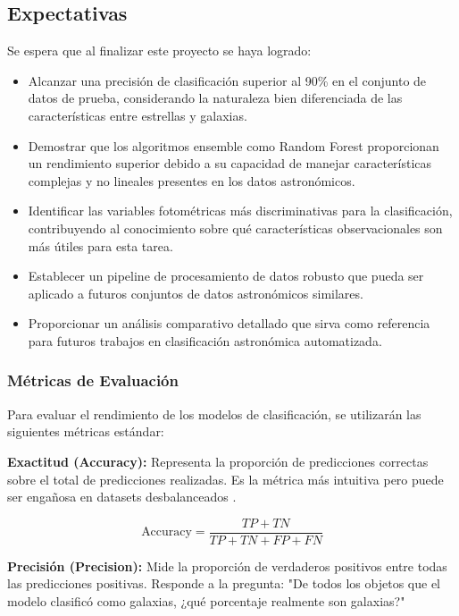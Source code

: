 \documentclass{article}
\begin{document}
\subsection{Expectativas}

Se espera que al finalizar este proyecto se haya logrado:

\begin{itemize}
    \item Alcanzar una precisión de clasificación superior al 90\% en el conjunto de datos de prueba, considerando la naturaleza bien diferenciada de las características entre estrellas y galaxias.
    \item Demostrar que los algoritmos ensemble como Random Forest proporcionan un rendimiento superior debido a su capacidad de manejar características complejas y no lineales presentes en los datos astronómicos.
    \item Identificar las variables fotométricas más discriminativas para la clasificación, contribuyendo al conocimiento sobre qué características observacionales son más útiles para esta tarea.
    \item Establecer un pipeline de procesamiento de datos robusto que pueda ser aplicado a futuros conjuntos de datos astronómicos similares.
    \item Proporcionar un análisis comparativo detallado que sirva como referencia para futuros trabajos en clasificación astronómica automatizada.
\end{itemize}

\subsubsection{Métricas de Evaluación}

Para evaluar el rendimiento de los modelos de clasificación, se utilizarán las siguientes métricas estándar:

\textbf{Exactitud (Accuracy):} Representa la proporción de predicciones correctas sobre el total de predicciones realizadas. Es la métrica más intuitiva pero puede ser engañosa en datasets desbalanceados \cite{accuracy_metric}.

\begin{equation}
\text{Accuracy} = \frac{TP + TN}{TP + TN + FP + FN}
\end{equation}

\textbf{Precisión (Precision):} Mide la proporción de verdaderos positivos entre todas las predicciones positivas. Responde a la pregunta: "De todos los objetos que el modelo clasificó como galaxias, ¿qué porcentaje realmente son galaxias?" \cite{precision_metric}
\end{document}
